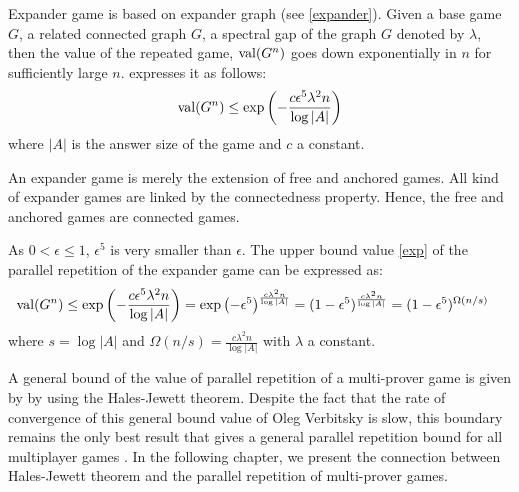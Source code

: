 Expander game is based on expander graph (see \eqref{expander}).  Given a base game $G$, a related connected graph $G$, a spectral gap of the graph $G$ denoted by $\lambda$,  then the value of the repeated game, $\mathrm{val} (G^n)$  goes down exponentially in $n$ for sufficiently large $n$. \cite*{dinur2016multiplayer} expresses it as follows:
\begin{align}
\mathrm{val} (G^n) \leq \exp \left(-\frac{c \epsilon^5 \lambda^2 n }{\log |A|}\right) \label{exp}
\end{align}
where $|A|$ is the answer size of the game and $c$ a constant.

An expander game is  merely the extension of free and anchored games. All kind of expander games are linked by the connectedness property. Hence, the free and anchored games are connected games. 

As $0 < \epsilon \leq 1$, $\epsilon^5$ is very smaller than $\epsilon$. The upper bound value \eqref{exp} of the parallel repetition of the expander game can be expressed as:
\begin{align*}
\mathrm{val} (G^n) & \leq \exp \left(-\frac{c \epsilon^5 \lambda^2 n }{\log |A|}\right) =\exp \left(-\epsilon^5\right)^{\frac{c  \lambda^2 n }{\log |A|}} =(1-\epsilon^5)^{ \frac{c  \lambda^2 n }{\log |A|}} =(1-\epsilon^5)^{ \Omega(n/s)}
\end{align*}
where $s=\log |A|$ and $\Omega(n/s)=\frac{c  \lambda^2 n }{\log |A|}$ with  $\lambda$ a constant.

A general bound of the value of parallel repetition of a multi-prover game is  given by  \cite{verbitsky1996towards} by using the Hales-Jewett theorem. Despite the fact that the rate of  convergence of this general bound value of Oleg Verbitsky is slow, this boundary  remains the only best result that gives a general parallel repetition bound for all multiplayer games \citep*{hkazla2016forbidden,dinur2016multiplayer}. In the following chapter, we present the connection between Hales-Jewett theorem and the parallel repetition of  multi-prover games. 

 
 